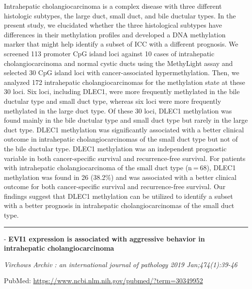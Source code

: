 \documentclass[]{article}
\begin{document}
Intrahepatic cholangiocarcinoma is a complex disease with three
different histologic subtypes, the large duct, small duct, and bile
ductular types. In the present study, we elucidated whether the three
histological subtypes have differences in their methylation profiles and
developed a DNA methylation marker that might help identify a subset of
ICC with a different prognosis. We screened 113 promoter CpG island loci
against 10 cases of intrahepatic cholangiocarcinoma and normal cystic
ducts using the MethyLight assay and selected 30 CpG island loci with
cancer-associated hypermethylation. Then, we analyzed 172 intrahepatic
cholangiocarcinomas for the methylation state at these 30 loci. Six
loci, including DLEC1, were more frequently methylated in the bile
ductular type and small duct type, whereas six loci were more frequently
methylated in the large duct type. Of these 30 loci, DLEC1 methylation
was found mainly in the bile ductular type and small duct type but
rarely in the large duct type. DLEC1 methylation was significantly
associated with a better clinical outcome in intrahepatic
cholangiocarcinomas of the small duct type but not of the bile ductular
type. DLEC1 methylation was an independent prognostic variable in both
cancer-specific survival and recurrence-free survival. For patients with
intrahepatic cholangiocarcinoma of the small duct type (n = 68), DLEC1
methylation was found in 26 (38.2\%) and was associated with a better
clinical outcome for both cancer-specific survival and recurrence-free
survival. Our findings suggest that DLEC1 methylation can be utilized to
identify a subset with a better prognosis in intrahepatic
cholangiocarcinomas of the small duct type.

{}

{}

\begin{center}\rule{0.5\linewidth}{\linethickness}\end{center}

 - \textbf{EVI1 expression is associated with aggressive behavior in
intrahepatic cholangiocarcinoma}

\emph{Virchows Archiv : an international journal of pathology 2019
Jan;474(1):39-46}

PubMed: \url{https://www.ncbi.nlm.nih.gov/pubmed/?term=30349952}
\end{document}
